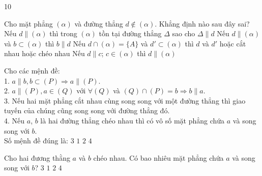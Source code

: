 \begin{indapan}{10}
\begin{ex}%
Cho mặt phẳng $(\alpha)$ và đường thẳng $d \notin(\alpha)$. Khẳng định nào sau đây sai?
\choice
{Nếu $d \parallel (\alpha)$ thì trong $(\alpha)$ tồn tại đường thẳng $\Delta$ sao cho $\Delta \parallel  d$}
{\True Nếu $d \parallel (\alpha)$ và $b \subset(\alpha)$ thì $b \parallel  d$}
{Nếu $d \cap(\alpha)=\{A\}$ và $d' \subset(\alpha)$ thì $d$ và $d'$ hoặc cắt nhau hoặc chéo nhau}
{Nếu $d \parallel  c $; $ c \in(\alpha)$ thì $d \parallel (\alpha)$}
\end{ex}

\begin{ex}%
Cho các mệnh đề:\\
1. $a \parallel  b, b \subset(P) \Rightarrow a \parallel (P)$.\\
2. $a \parallel (P), a \in(Q)$ với $\forall(Q)$ và $(Q) \cap(P)=b \Rightarrow b \parallel  a$.\\
3. Nếu hai mặt phẳng cắt nhau cùng song song với một đường thẳng thì giao tuyến của chúng cũng song song với đường thẳng đó.\\
4. Nếu $a$, $b$ là hai đường thẳng chéo nhau thì có vô số mặt phẳng chứa $a$ và song song với $b$. \\
Số mệnh đề đúng là:
\choice
{\True $3$}
{$1$}
{$2$}
{$4$}
\end{ex}

\begin{ex}%
Cho hai đương thằng $a$ và $b$ chéo nhau. Có bao nhiêu mặt phẳng chứa $a$ và song song với $b$?
\choice
{$3$}
{\True $1$}
{$2$}
{$4$}
\end{ex}



\end{indapan}
